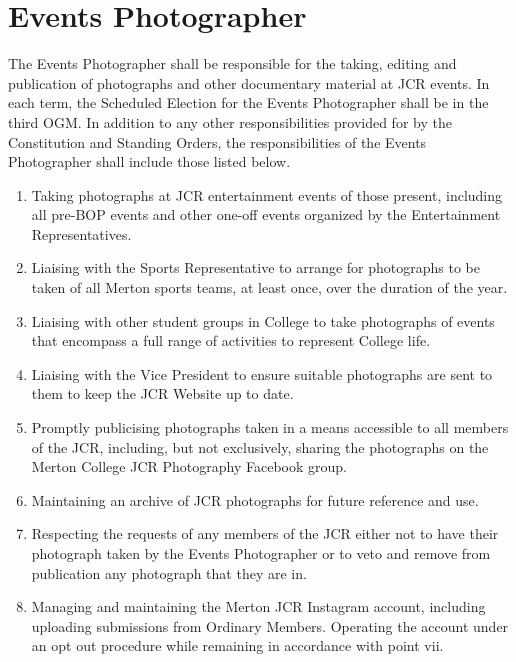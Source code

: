 \section{Events Photographer}
\npara The Events Photographer shall be responsible for the taking, editing and publication of photographs and other documentary material at JCR events.
\npara In each term, the Scheduled Election for the Events Photographer shall be in the third OGM.
\npara In addition to any other responsibilities provided for by the Constitution and Standing Orders, the responsibilities of the Events Photographer shall include those listed below.
\begin{enumerate}
	\item Taking photographs at JCR entertainment events of those present, including all pre-BOP events and other one-off events organized by the Entertainment Representatives.
	\item Liaising with the Sports Representative to arrange for photographs to be taken of all Merton sports teams, at least once, over the duration of the year.
	\item Liaising with other student groups in College to take photographs of events that encompass a full range of activities to represent College life.
	\item Liaising with the Vice President to ensure suitable photographs are sent to them to keep the JCR Website up to date.      
	\item Promptly publicising photographs taken in a means accessible to all members of the JCR, including, but not exclusively, sharing the photographs on the Merton College JCR Photography Facebook group.
	\item Maintaining an archive of JCR photographs for future reference and use.
	\item Respecting the requests of any members of the JCR either not to have their photograph taken by the Events Photographer or to veto and remove from publication any photograph that they are in.
	\item Managing and maintaining the Merton JCR Instagram account, including uploading submissions from Ordinary Members.  Operating the account under an opt out procedure while remaining in accordance with point vii.
\end{enumerate}
